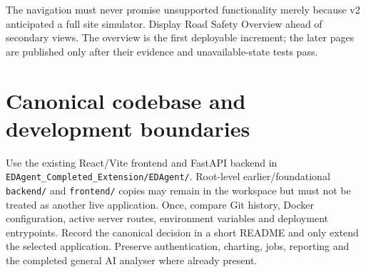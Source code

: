 \documentclass[11pt,a4paper,openany]{report}
\newcommand{\pathcode}[1]{\nolinkurl{#1}}
\begin{document}
The navigation must never promise unsupported functionality merely because v2 anticipated a full site simulator. Display Road Safety Overview ahead of secondary views. The overview is the first deployable increment; the later pages are published only after their evidence and unavailable-state tests pass.

\section{Canonical codebase and development boundaries}
Use the existing React/Vite frontend and FastAPI backend in \pathcode{EDAgent_Completed_Extension/EDAgent/}. Root-level earlier/foundational \pathcode{backend/} and \pathcode{frontend/} copies may remain in the workspace but must not be treated as another live application. Once, compare Git history, Docker configuration, active server routes, environment variables and deployment entrypoints. Record the canonical decision in a short README and only extend the selected application. Preserve authentication, charting, jobs, reporting and the completed general AI analyser where already present.
\end{document}
